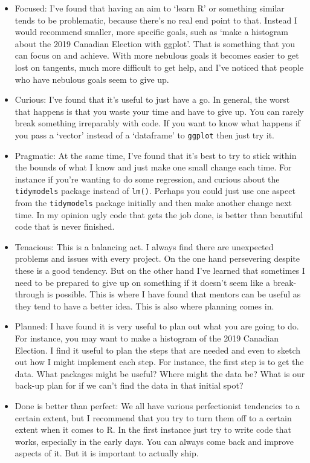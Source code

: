 \documentclass[
]{book}
\providecommand{\tightlist}{%
  \setlength{\itemsep}{0pt}\setlength{\parskip}{0pt}}
\begin{document}
\begin{itemize}
\tightlist
\item
  Focused: I've found that having an aim to `learn R' or something similar tends to be problematic, because there's no real end point to that. Instead I would recommend smaller, more specific goals, such as `make a histogram about the 2019 Canadian Election with ggplot'. That is something that you can focus on and achieve. With more nebulous goals it becomes easier to get lost on tangents, much more difficult to get help, and I've noticed that people who have nebulous goals seem to give up.
\item
  Curious: I've found that it's useful to just have a go. In general, the worst that happens is that you waste your time and have to give up. You can rarely break something irreparably with code. If you want to know what happens if you pass a `vector' instead of a `dataframe' to \texttt{ggplot} then just try it.
\item
  Pragmatic: At the same time, I've found that it's best to try to stick within the bounds of what I know and just make one small change each time. For instance if you're wanting to do some regression, and curious about the \texttt{tidymodels} package \citep{citeTidymodels} instead of \texttt{lm()}. Perhaps you could just use one aspect from the \texttt{tidymodels} package initially and then make another change next time. In my opinion ugly code that gets the job done, is better than beautiful code that is never finished.
\item
  Tenacious: This is a balancing act. I always find there are unexpected problems and issues with every project. On the one hand persevering despite these is a good tendency. But on the other hand I've learned that sometimes I need to be prepared to give up on something if it doesn't seem like a break-through is possible. This is where I have found that mentors can be useful as they tend to have a better idea. This is also where planning comes in.
\item
  Planned: I have found it is very useful to plan out what you are going to do. For instance, you may want to make a histogram of the 2019 Canadian Election. I find it useful to plan the steps that are needed and even to sketch out how I might implement each step. For instance, the first step is to get the data. What packages might be useful? Where might the data be? What is our back-up plan for if we can't find the data in that initial spot?
\item
  Done is better than perfect: We all have various perfectionist tendencies to a certain extent, but I recommend that you try to turn them off to a certain extent when it comes to R. In the first instance just try to write code that works, especially in the early days. You can always come back and improve aspects of it. But it is important to actually ship.
\end{itemize}
\end{document}

